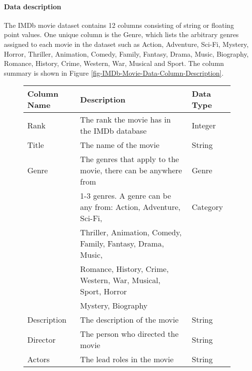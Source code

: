     \paragraph{Data description}
    The IMDb movie dataset contains 12 columns consisting of string or floating point values.
    One unique column is the Genre, which lists the arbitrary genres assigned to each movie in the dataset such as Action, Adventure, Sci-Fi, Mystery, Horror, Thriller, 
        Animation, Comedy, Family, Fantasy, Drama, Music, Biography, Romance, History, Crime, Western, War, Musical and Sport.
    The column summary is shown in Figure \ref*{fig-IMDb-Movie-Data-Column-Description}.
        \begin{figure}[h]
            \centering
            \begin{tabular}[width=\linewidth]{lll}
                \toprule
                Column Name &           Description                                                                 & Data Type \\
                \midrule
                Rank &                  The rank the movie has in the IMDb database                                 & Integer \\          
                Title &                 The name of the movie                                                       & String \\
                Genre &                 The genres that apply to the movie, there can be anywhere from              & Genre \\
                {}      &               1-3 genres. A genre can be any from: Action, Adventure, Sci-Fi,             & Category \\
                {}      &               Thriller, Animation, Comedy, Family, Fantasy, Drama, Music,                 & {} \\
                {}      &               Romance, History, Crime, Western, War, Musical, Sport, Horror               & {} \\
                {}      &               Mystery, Biography                                                          & {} \\
                Description &           The description of the movie                                                & String \\
                Director &              The person who directed the movie                                           & String \\
                Actors &                The lead roles in the movie                                                 & String \\

\end{tabular}
\end{figure}
